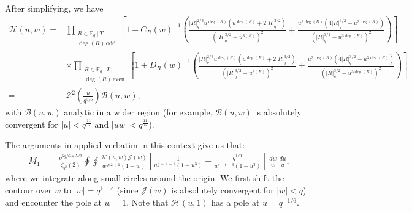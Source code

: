\documentclass[table]{amsart}
\newcommand{\op}[1]{\operatorname{#1}}
\numberwithin{equation}{section}
\begin{document}
\noindent After simplifying, we have
{\small \begin{align}
\mathcal{H}(u,w) =& \prod_{\substack{R \in \mathbb{F}_q[T] \\ \deg(R)  \,\mathrm{ odd}}} \left[1+C_R(w)^{-1} \left ( \frac{|R|_q^{2/3} u^{\op{deg}(R)}\left(u^{\op{deg}(R)}+2|R|_q^{3/2}\right)}{\left(|R|_q^{3/2}-u^{3(R)}\right)^2} + \frac{ u^{3 \deg(R)}(4|R|_q^{3/2}-u^{3\deg(R)})}{ (|R|_q^{3/2}-u^{3 \deg(R)})^2}\right )\right] \nonumber \\
& \times  \prod_{\substack{R \in \mathbb{F}_q[T] \\ \deg(R)  \,\mathrm{ even}}} \left[1+D_R(w)^{-1} \left ( \frac{|R|_q^{2/3} u^{\op{deg}(R)}\left(u^{\op{deg}(R)}+2|R|_q^{3/2}\right)}{\left(|R|_q^{3/2}-u^{3(R)}\right)^2}+ \frac{ u^{3 \deg(R)}(4|R|_q^{3/2}-u^{3\deg(R)})}{ (|R|_q^{3/2}-u^{3 \deg(R)})^2}\right ) \right] \nonumber \\
=&\mathcal{Z}^2 \left ( \frac{u}{q^{5/6}}\right ) \mathcal{B}(u,w),
\end{align}}
\noindent with $\mathcal{B}(u,w)$ analytic in a wider region (for example, $\mathcal{B}(u,w)$ is absolutely convergent for $|u|<q^{\frac{11}{6}}$ and $|uw|< q^{\frac{11}{6}}$). 

The arguments in \cite{DFLCubic} applied verbatim in this context give us that:
\begin{align*}\label{twoterms}
M_1 =&\frac{q^{5g/6+5/3}}{\zeta_{q^2}(2)} \oint \oint \frac{\mathcal{H}(u,w) \mathcal{J}(w)}{w^{g/2+1}(1-w)} \left[ \frac{1}{u^{g-A-1} (1-u^3)} + \frac{ q^{1/3}}{u^{g-t-3}(1-u^3)} \right] \, \frac{dw}{w} \, \frac{du}{u},
\end{align*}
where we integrate along small circles around the origin. We first shift the contour over $w$ to $|w|=q^{1-\varepsilon}$ (since $\mathcal{J}(w)$ is absolutely convergent for $|w|<q$) and encounter the pole at $w=1$. Note that $\mathcal{H}(u,1)$ has a pole at $u=q^{-1/6}$.
\end{document}
